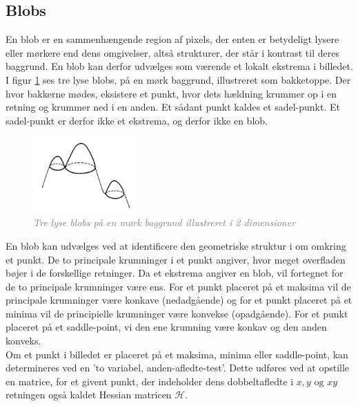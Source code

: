 \subsection*{Blobs}\label{sec:blobs}
En blob er en sammenhængende region af pixels, der enten er betydeligt lysere eller mørkere end dens omgivelser, altså strukturer, der står i kontrast til deres baggrund. En blob kan derfor udvælges som værende et lokalt ekstrema i billedet.
I figur \ref{fig:lindblob} ses tre lyse blobs, på en mørk baggrund, illustreret som bakketoppe. Der hvor bakkerne mødes, eksistere et punkt, hvor dets hældning krummer op i en retning og krummer ned i en anden. Et sådant punkt kaldes et sadel-punkt. Et sadel-punkt er derfor ikke et ekstrema, og derfor ikke en blob.
\begin{figure}[H]
    \centering
    \includegraphics[width=0.35\textwidth]{fig/44.png}
    \vspace{-0.5em}   
    \begin{center}
    \caption{\textcolor{gray}{\footnotesize \textit{
    Tre lyse blobs på en mørk baggrund illustreret i 2 dimensioner \cite{blob}}}}
    \label{fig:lindblob}
     \end{center}
  \end{figure}
       \vspace{-2.7em}
\noindent
En blob kan udvælges ved at identificere den geometriske struktur i om omkring et punkt. De to principale krumninger i et punkt angiver, hvor meget overfladen bøjer i de forskellige retninger. Da et ekstrema angiver en blob, vil fortegnet for de to principale krumninger være ens. For et punkt placeret på et maksima vil de principale krumninger være konkave (nedadgående) og for et punkt placeret på et minima vil de principielle krumninger være konvekse (opadgående). For et punkt placeret på et saddle-point, vi den ene krumning være konkav og den anden konveks. \\ 
Om et punkt i billedet er placeret på et maksima, minima eller saddle-point, kan determineres ved en 'to variabel, anden-afledte-test'. Dette udføres ved at opstille en matrice, for et givent punkt, der indeholder dens dobbeltafledte i $x, y \text{ og } xy$ retningen også kaldet Hessian matricen $\mathcal{H}$.

